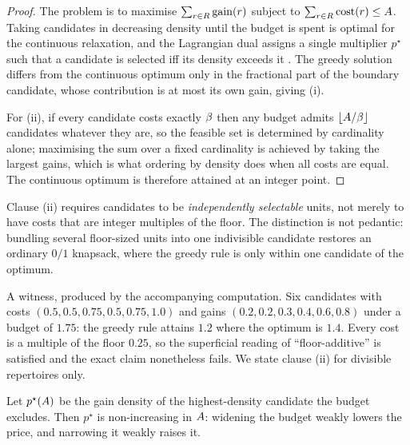 \begin{proof}
The problem is to maximise $\sum_{r\in R}\mathrm{gain}(r)$ subject to
$\sum_{r\in R}\mathrm{cost}(r)\le A$. Taking candidates in decreasing density
until the budget is spent is optimal for the continuous relaxation, and the
Lagrangian dual assigns a single multiplier $p^{\star}$ such that a
candidate is selected iff its density exceeds it \citep{dantzig1957}. The
greedy solution differs from the continuous optimum only in the fractional
part of the boundary candidate, whose contribution is at most its own gain,
giving (i).

For (ii), if every candidate costs exactly $\beta$ then any budget admits
$\lfloor A/\beta\rfloor$ candidates whatever they are, so the feasible set
is determined by cardinality alone; maximising the sum over a fixed
cardinality is achieved by taking the largest gains, which is what ordering
by density does when all costs are equal. The continuous optimum is
therefore attained at an integer point.
\end{proof}

\begin{remark}
\label{rem:divisibility}
Clause (ii) requires candidates to be \emph{independently selectable} units,
not merely to have costs that are integer multiples of the floor. The
distinction is not pedantic: bundling several floor-sized units into one
indivisible candidate restores an ordinary $0/1$ knapsack, where the greedy
rule is only within one candidate of the optimum.

A witness, produced by the accompanying computation. Six candidates with
costs $(0.5,0.5,0.75,0.5,0.75,1.0)$ and gains
$(0.2,0.2,0.3,0.4,0.6,0.8)$ under a budget of $1.75$: the greedy rule
attains $1.2$ where the optimum is $1.4$. Every cost is a multiple of the
floor $0.25$, so the superficial reading of ``floor-additive'' is satisfied
and the exact claim nonetheless fails. We state clause (ii) for divisible
repertoires only.
\end{remark}

\begin{proposition}
\label{prop:shadow-price}
Let $p^{\star}(A)$ be the gain density of the highest-density candidate
the budget excludes. Then $p^{\star}$ is non-increasing in $A$: widening
the budget weakly lowers the price, and narrowing it weakly raises it.
\end{proposition}

